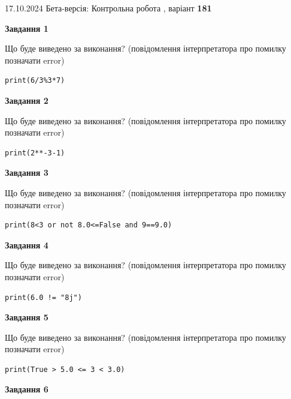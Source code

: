 \documentclass[12pt, ukrainian]{article}
\begin{document}
{\Large{17.10.2024 Бета-версія: Контрольна робота , варіант  \No \textbf { 181 }\par}}
{
\begin {large}
{\begin {center}\textbf{Завдання 1}\end {center}}

Що буде виведено за виконання? (повідомлення інтерпретатора про помилку позначати error)\par
\begin{verbatim}
print(6/3%3*7)
\end{verbatim}

{\begin {center}\textbf{Завдання 2}\end {center}}

Що буде виведено за виконання? (повідомлення інтерпретатора про помилку позначати error)\par
\begin{verbatim}
print(2**-3-1)
\end{verbatim}

{\begin {center}\textbf{Завдання 3}\end {center}}

Що буде виведено за виконання? (повідомлення інтерпретатора про помилку позначати error)\par
\begin{verbatim}
print(8<3 or not 8.0<=False and 9==9.0)
\end{verbatim}

{\begin {center}\textbf{Завдання 4}\end {center}}

Що буде виведено за виконання? (повідомлення інтерпретатора про помилку позначати error)\par
\begin{verbatim}
print(6.0 != "8j")
\end{verbatim}

{\begin {center}\textbf{Завдання 5}\end {center}}

Що буде виведено за виконання? (повідомлення інтерпретатора про помилку позначати error)\par
\begin{verbatim}
print(True > 5.0 <= 3 < 3.0)
\end{verbatim}

{\begin {center}\textbf{Завдання 6}\end {center}}


\end{large}}
\end{document}
